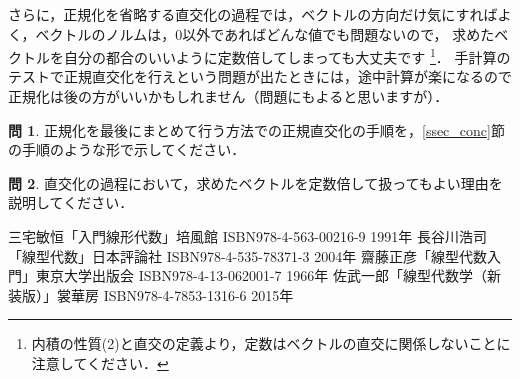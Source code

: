 \documentclass[dvipdfmx]{jsarticle}
\theoremstyle{definition}
\newtheorem{question}{問}[section]
\begin{document}
さらに，正規化を省略する直交化の過程では，ベクトルの方向だけ気にすればよく，ベクトルのノルムは，0以外であればどんな値でも問題ないので，
求めたベクトルを自分の都合のいいように定数倍してしまっても大丈夫です
\footnote{内積の性質(2)と直交の定義より，定数はベクトルの直交に関係しないことに注意してください．}．
手計算のテストで正規直交化を行えという問題が出たときには，途中計算が楽になるので正規化は後の方がいいかもしれません（問題にもよると思いますが）．

\begin{question}
    正規化を最後にまとめて行う方法での正規直交化の手順を，\ref{ssec_conc}節の手順のような形で示してください．
\end{question}

\begin{question}
    直交化の過程において，求めたベクトルを定数倍して扱ってもよい理由を説明してください．
\end{question}



\begin{thebibliography}{9}
     三宅敏恒「入門線形代数」培風館 ISBN978-4-563-00216-9 1991年
     長谷川浩司「線型代数」日本評論社 ISBN978-4-535-78371-3 2004年
     齋藤正彦「線型代数入門」東京大学出版会 ISBN978-4-13-062001-7 1966年
     佐武一郎「線型代数学（新装版）」裳華房 ISBN978-4-7853-1316-6 2015年
\end{thebibliography}
\end{document}
